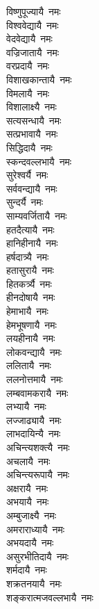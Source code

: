 \begin{flushleft}
\begin{multicols}{2}
विष्णुपूज्यायै~नमः\\
विश्ववेद्यायै~नमः\\
वेदवेद्यायै~नमः\\
वज्रिजातायै~नमः\\
वरप्रदायै~नमः\\
विशाखकान्तायै~नमः\\
विमलायै~नमः\\
विशालाक्ष्यै~नमः\\
सत्यसन्धायै~नमः\\
सत्प्रभावायै~नमः\hfill{}\\
सिद्धिदायै~नमः\\
स्कन्दवल्लभायै~नमः\\
सुरेश्वर्यै~नमः\\
सर्ववन्द्यायै~नमः\\
सुन्दर्यै~नमः\\
साम्यवर्जितायै~नमः\\
हतदैत्यायै~नमः\\
हानिहीनायै~नमः\\
हर्षदात्र्यै~नमः\\
हतासुरायै~नमः\hfill{}\\
हितकर्त्र्यै~नमः\\
हीनदोषायै~नमः\\
हेमाभायै~नमः\\
हेमभूषणायै~नमः\\
लयहीनायै~नमः\\
लोकवन्द्यायै~नमः\\
ललितायै~नमः\\
ललनोत्तमायै~नमः\\
लम्बवामकरायै~नमः\\
लभ्यायै~नमः\hfill{}\\
लज्जाढ्यायै~नमः\\
लाभदायिन्यै~नमः\\
अचिन्त्यशक्त्यै~नमः\\
अचलायै~नमः\\
अचिन्त्यरूपायै~नमः\\
अक्षरायै~नमः\\
अभयायै~नमः\\
अम्बुजाक्ष्यै~नमः\\
अमराराध्यायै~नमः\\
अभयदायै~नमः\hfill{}\\
असुरभीतिदायै~नमः\\
शर्मदायै~नमः\\
शक्रतनयायै~नमः\\
शङ्करात्मजवल्लभायै~नमः\\

\end{multicols}
\end{flushleft}
